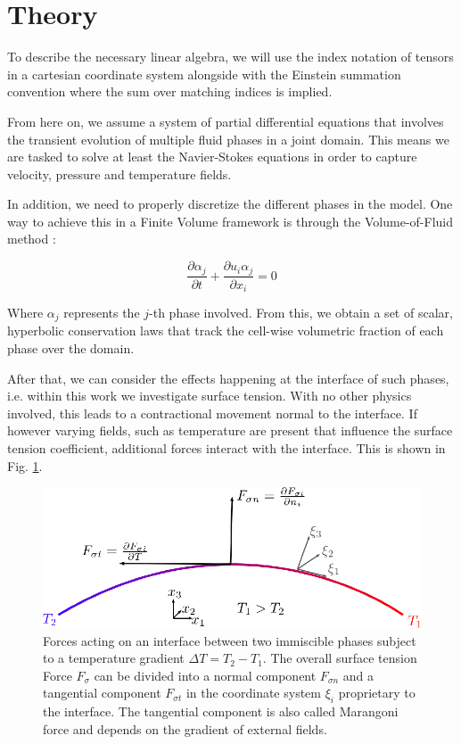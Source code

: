 \documentclass[conference,final]{IEEEtran}
\begin{document}
\section{Theory}

To describe the necessary linear algebra, we will use the index notation of tensors in a cartesian coordinate system alongside with the Einstein summation convention where the sum over matching indices is implied.

From here on, we assume a system of partial differential equations that involves the transient evolution of multiple fluid phases in a joint domain. This means we are tasked to solve at least the Navier-Stokes equations in order to capture velocity, pressure and temperature fields.

In addition, we need to properly discretize the different phases in the model. One way to achieve this in a Finite Volume framework is through the Volume-of-Fluid method \cite{hirtVolumeFluidVOF1981}:

\begin{equation}
  \frac{\partial \alpha_{j}}{\partial t} + \frac{\partial u_{i} \alpha_{j}}{\partial x_{i}} = 0
\end{equation}

Where $\alpha_{j}$ represents the $j$-th phase involved. From this, we obtain a set of scalar, hyperbolic conservation laws that track the cell-wise volumetric fraction of each phase over the domain.

After that, we can consider the effects happening at the interface of such phases, i.e. within this work we investigate surface tension. With no other physics involved, this leads to a contractional movement normal to the interface. If however varying fields, such as temperature are present that influence the surface tension coefficient, additional forces interact with the interface. This is shown in Fig. \ref{fig:surface-tension}.

\begin{figure}[!tbp]
  \centering
  \includegraphics[width=\linewidth]{Figs/surface-tension.eps}
  \caption{Forces acting on an interface between two immiscible phases subject to a temperature gradient $\Delta T = T_{2} - T_{1}$. The overall surface tension Force $F_{\sigma}$ can be divided into a normal component $F_{\sigma n}$ and a tangential component $F_{\sigma t}$ in the coordinate system $\xi_{i}$ proprietary to the interface. The tangential component is also called Marangoni force and depends on the gradient of external fields.}
  \label{fig:surface-tension}
\end{figure}
\end{document}
